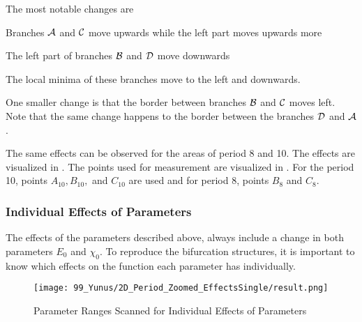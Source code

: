 The most notable changes are
\begin{enumerate*}
    \item Branches $\mathcal{A}$ and $\mathcal{C}$ move upwards while the left part moves upwards more
    \item The left part of branches $\mathcal{B}$ and $\mathcal{D}$ move downwards 
    \item The local minima of these branches move to the left and downwards.
\end{enumerate*}
One smaller change is that the border between branches $\mathcal{B}$ and $\mathcal{C}$ moves left.
Note that the same change happens to the border between the branches $\mathcal{D}$ and $\mathcal{A}$.

The same effects can be observed for the areas of period 8 and 10.
The effects are visualized in .
The points used for measurement are visualized in .
For the period 10, points $A_{10}, B_{10},$ and $C_{10}$ are used and for period 8, points $B_8$ and $C_8$.

\subsubsection{Individual Effects of Parameters}

The effects of the parameters described above, always include a change in both parameters $E_0$ and $\chi_0$.
To reproduce the bifurcation structures, it is important to know which effects on the function each parameter has individually.

\begin{figure}
    \centering
    \texttt{[image: 99\_Yunus/2D\_Period\_Zoomed\_EffectsSingle/result.png]}
    \label{fig:yunus.function.evolution.single.map}
    \caption{Parameter Ranges Scanned for Individual Effects of Parameters}
\end{figure}

